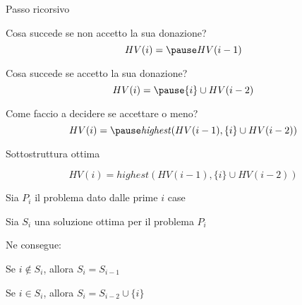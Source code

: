 \begin{frame}{Passo ricorsivo}

\vspace{-9pt}
\BI
\item Cosa succede se non accetto la sua donazione?
\EI
\[
HV(i) = \pause HV(i-1)
\]

\BI
\item Cosa succede se accetto la sua donazione?
\EI
\[
HV(i) = \pause \{ i \} \cup HV(i-2)  
\]

\BI
\item Come faccio a decidere se accettare o meno?
\EI
\[
HV(i) = \pause \mathit{highest}(HV(i-1), \{ i \} \cup HV(i-2)  )
\]

\end{frame}

\begin{frame}{Sottostruttura ottima}

\[
HV(i) = \mathit{highest}(HV(i-1), \{ i \} \cup HV(i-2)  )
\]

\pause
\begin{myboxtitle}
\BIL
\item Sia $P_i$ il problema dato dalle prime $i$ case
\item Sia $S_i$ una soluzione ottima per il problema $P_i$
\item Ne consegue:
  \BI
  \item Se $i \not\in S_i$, allora $S_i=S_{i-1}$
  \item Se $i \in S_i$, allora $S_i=S_{i-2} \cup \{i\}$
  \EI
\EIL    
\end{myboxtitle}

\end{frame}


